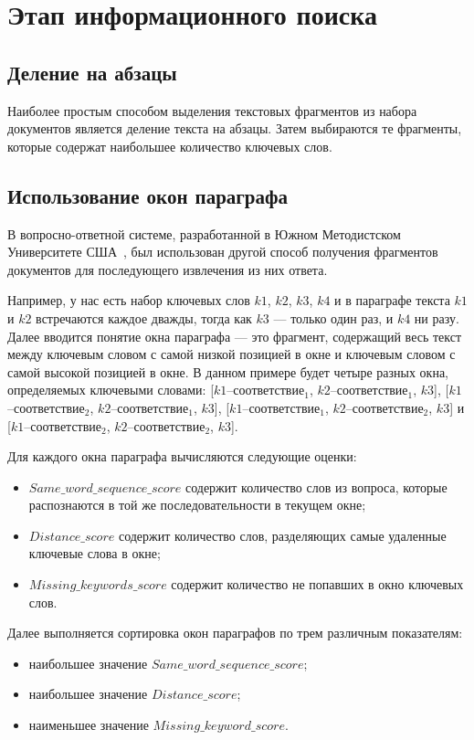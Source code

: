 \section{Этап информационного поиска}

\subsection{Деление на абзацы}

Наиболее простым способом выделения текстовых фрагментов из набора документов является деление текста на абзацы. Затем выбираются те фрагменты, которые содержат наибольшее количество ключевых слов.

\subsection{Использование окон параграфа}

В вопросно-ответной системе, разработанной в Южном Методистском Университете
США~\cite{step2}, был использован другой способ получения фрагментов документов для последующего извлечения из них ответа.

Например, у нас есть набор ключевых слов {$k1$, $k2$, $k3$, $k4$} и в параграфе текста $k1$ и $k2$ встречаются каждое дважды, тогда как $k3$ --- только один раз, и $k4$ ни разу. Далее вводится понятие окна параграфа --- это фрагмент, содержащий весь текст между ключевым словом с самой низкой позицией в окне и ключевым словом с самой высокой позицией в окне. В данном примере  будет четыре разных окна, определяемых ключевыми словами: [$k1$--соответствие$_1$, $k2$--соответствие$_1$, $k3$], [$k1$--соответствие$_2$, $k2$--соответствие$_1$, $k3$], [$k1$--соответствие$_1$, $k2$--соответствие$_2$, $k3$] и [$k1$--соответствие$_2$, $k2$--соответствие$_2$, $k3$].

Для каждого окна параграфа вычисляются следующие оценки:
\begin{itemize}[label=---]
	\item $Same\_word\_sequence\_score$ содержит количество слов из вопроса, которые распознаются в той же последовательности в текущем окне;
	\item $Distance\_score$ содержит количество слов, разделяющих самые удаленные ключевые слова в окне;
	\item $Missing\_keywords\_score$ содержит количество не попавших в окно ключевых слов. 
\end{itemize}

Далее выполняется сортировка окон параграфов по трем различным показателям:
\begin{itemize}[label=---]
	\item наибольшее значение $Same\_word\_sequence\_score$;
	\item наибольшее значение $Distance\_score$;
	\item наименьшее значение $Missing\_keyword\_score$.
\end{itemize}

